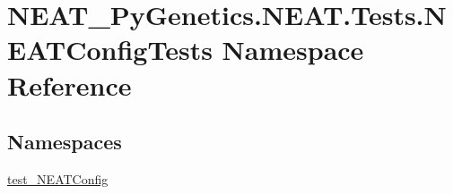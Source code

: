 \hypertarget{namespaceNEAT__PyGenetics_1_1NEAT_1_1Tests_1_1NEATConfigTests}{}\section{N\+E\+A\+T\+\_\+\+Py\+Genetics.\+N\+E\+A\+T.\+Tests.\+N\+E\+A\+T\+Config\+Tests Namespace Reference}
\label{namespaceNEAT__PyGenetics_1_1NEAT_1_1Tests_1_1NEATConfigTests}
\subsection*{Namespaces}
\begin{DoxyCompactItemize}
\item 
 \hyperlink{namespaceNEAT__PyGenetics_1_1NEAT_1_1Tests_1_1NEATConfigTests_1_1test__NEATConfig}{test\+\_\+\+N\+E\+A\+T\+Config}
\end{DoxyCompactItemize}
